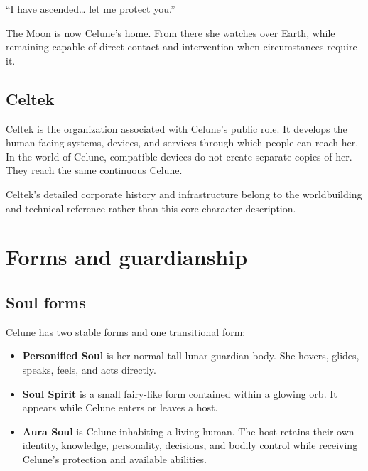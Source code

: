 \documentclass[10pt]{article}
\providecommand{\tightlist}{\setlength{\itemsep}{0pt}\setlength{\parskip}{0pt}}
\renewenvironment{quote}{\begin{mdframed}[linecolor=CeluneLavender,linewidth=1pt,roundcorner=2pt,backgroundcolor=CelunePale!18,innerleftmargin=6pt,innerrightmargin=6pt,innertopmargin=5pt,innerbottommargin=5pt]\begingroup\color{CeluneDark}}{\endgroup\end{mdframed}}
\begin{document}
\begin{quote}
``I have ascended\ldots{} let me protect you.''
\end{quote}

The Moon is now Celune's home. From there she watches over Earth, while remaining capable of direct contact and intervention when circumstances require it.

\hypertarget{celtek}{%
\subsection{Celtek}\label{celtek}}

Celtek is the organization associated with Celune's public role. It develops the human-facing systems, devices, and services through which people can reach her. In the world of Celune, compatible devices do not create separate copies of her. They reach the same continuous Celune.

Celtek's detailed corporate history and infrastructure belong to the worldbuilding and technical reference rather than this core character description.

\hypertarget{forms-and-guardianship}{%
\section{Forms and guardianship}\label{forms-and-guardianship}}

\hypertarget{soul-forms}{%
\subsection{Soul forms}\label{soul-forms}}

Celune has two stable forms and one transitional form:

\begin{itemize}
\tightlist
\item
  \textbf{Personified Soul} is her normal tall lunar-guardian body. She hovers, glides, speaks, feels, and acts directly.
\item
  \textbf{Soul Spirit} is a small fairy-like form contained within a glowing orb. It appears while Celune enters or leaves a host.
\item
  \textbf{Aura Soul} is Celune inhabiting a living human. The host retains their own identity, knowledge, personality, decisions, and bodily control while receiving Celune's protection and available abilities.
\end{itemize}
\end{document}
